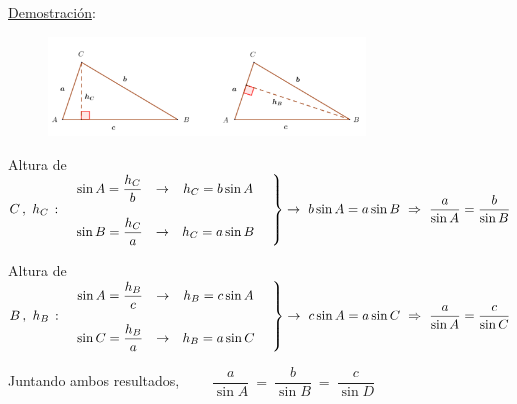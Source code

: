 \underline{Demostración}:

\begin{figure}[H]
	\centering
	\includegraphics[width=0.75\textwidth]{img-triang/triang05.png}
\end{figure}

Altura de $C\, , \ h_C\, : \quad  \left. \mqty{ \sin A = \dfrac {h_C} b & \to & h_C=b\sin A & \ \\ \\ \sin B = \dfrac {h_C} a & \to & h_C=a\sin B &\  } \right\} \to \ b\sin A=a\sin B \ \Rightarrow \ \dfrac{a}{\sin A}=\dfrac{b}{\sin B}$

\vspace{2mm}
Altura de $B\, , \ h_B\, : \quad  \left. \mqty{ \sin A = \dfrac {h_B} c & \to & h_B=c\sin A & \ \\ \\ \sin C = \dfrac {h_B} a & \to & h_B=a\sin C &\  } \right\} \to \ c\sin A=a\sin C \ \Rightarrow \ \dfrac{a}{\sin A}=\dfrac{c}{\sin C}$

\vspace{2mm} Juntando ambos resultados, $\qquad  \dfrac{a}{\sin A} \ = \  \dfrac{b}{\sin B} \ = \  \dfrac{c}{\sin D}$\QED



